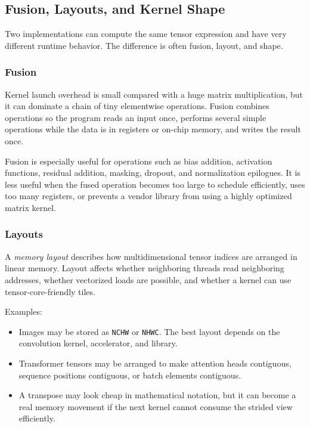 \subsection{Fusion, Layouts, and Kernel Shape}

Two implementations can compute the same tensor expression and have very different runtime behavior. The difference is often fusion, layout, and shape.

\subsubsection{Fusion}

Kernel launch overhead is small compared with a huge matrix multiplication, but it can dominate a chain of tiny elementwise operations. Fusion combines operations so the program reads an input once, performs several simple operations while the data is in registers or on-chip memory, and writes the result once.

Fusion is especially useful for operations such as bias addition, activation functions, residual addition, masking, dropout, and normalization epilogues. It is less useful when the fused operation becomes too large to schedule efficiently, uses too many registers, or prevents a vendor library from using a highly optimized matrix kernel.

\subsubsection{Layouts}

A \emph{memory layout} describes how multidimensional tensor indices are arranged in linear memory. Layout affects whether neighboring threads read neighboring addresses, whether vectorized loads are possible, and whether a kernel can use tensor-core-friendly tiles.

Examples:

\begin{itemize}[leftmargin=*]
  \item Images may be stored as \texttt{NCHW} or \texttt{NHWC}. The best layout depends on the convolution kernel, accelerator, and library.
  \item Transformer tensors may be arranged to make attention heads contiguous, sequence positions contiguous, or batch elements contiguous.
  \item A transpose may look cheap in mathematical notation, but it can become a real memory movement if the next kernel cannot consume the strided view efficiently.
\end{itemize}

